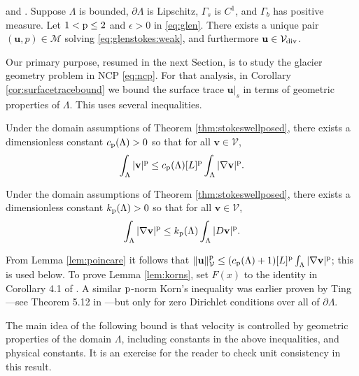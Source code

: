 \documentclass[hidelinks,onefignum,onetabnum,final]{siamart220329}  %
\newcommand{\eps}{\epsilon}
\newcommand{\grad}{\nabla}
\newcommand{\bu}{\mathbf{u}}
\newcommand{\bv}{\mathbf{v}}
\newcommand{\cV}{\mathcal{V}}
\newcommand{\pp}{{\text{\textnormal{p}}}}
\newcommand{\Vdiv}{\cV_{\text{\textnormal{div}}}}
\begin{document}
\begin{theorem} \label{thm:stokeswellposed} \cite[Theorem 3.10]{JouvetRappaz2011} and \cite[Appendix A]{IsaacStadlerGhattas2015}.  Suppose $\Lambda$ is bounded, $\partial\Lambda$ is Lipschitz, $\Gamma_s$ is $C^1$, and $\Gamma_b$ has positive measure.  Let $1<\pp\le 2$ and $\eps>0$ in \eqref{eq:glen}.  There exists a unique pair $(\bu,p) \in \mathcal{M}$ solving \eqref{eq:glenstokes:weak}, and furthermore $\bu\in \Vdiv$.
\end{theorem}

Our primary purpose, resumed in the next Section, is to study the glacier geometry problem in NCP \eqref{eq:ncp}.  For that analysis, in Corollary \ref{cor:surfacetracebound} we bound the surface trace $\bu|_s$ in terms of geometric properties of $\Lambda$.  This uses several inequalities.

\begin{lemma} \label{lem:poincare}
Under the domain assumptions of Theorem \ref{thm:stokeswellposed}, there exists a dimensionless constant $c_{\pp}(\Lambda)>0$ so that for all $\bv \in \cV$,
\begin{equation}
\int_\Lambda |\bv|^\pp \le c_{\pp}(\Lambda) [L]^\pp \int_\Lambda |\grad\bv|^\pp. \label{eq:poincare}
\end{equation}
\end{lemma}

\begin{lemma} \label{lem:korns}
Under the domain assumptions of Theorem \ref{thm:stokeswellposed}, there exists a dimensionless constant $k_{\pp}(\Lambda)>0$ so that for all $\bv \in \cV$,
\begin{equation}
\int_\Lambda |\grad\bv|^\pp \le k_{\pp}(\Lambda) \int_\Lambda |D\bv|^\pp. \label{eq:korns}
\end{equation}
\end{lemma}

From Lemma \ref{lem:poincare} it follows that $\|\bu\|_{\cV}^\pp \le (c_{\pp}(\Lambda) + 1) [L]^\pp \int_\Lambda |\grad\bv|^\pp$; this is used below.  To prove Lemma \ref{lem:korns}, set $F(x)$ to the identity in Corollary 4.1 of \cite{Pompe2003}.  A similar $\pp$-norm Korn's inequality was earlier proven by Ting \cite{Ting1972}---see Theorem 5.12 in \cite{KikuchiOden1988}---but only for zero Dirichlet conditions over all of $\partial \Lambda$.

The main idea of the following bound is that velocity is controlled by geometric properties of the domain $\Lambda$, including constants in the above inequalities, and physical constants.  It is an exercise for the reader to check unit consistency in this result.
\end{document}
